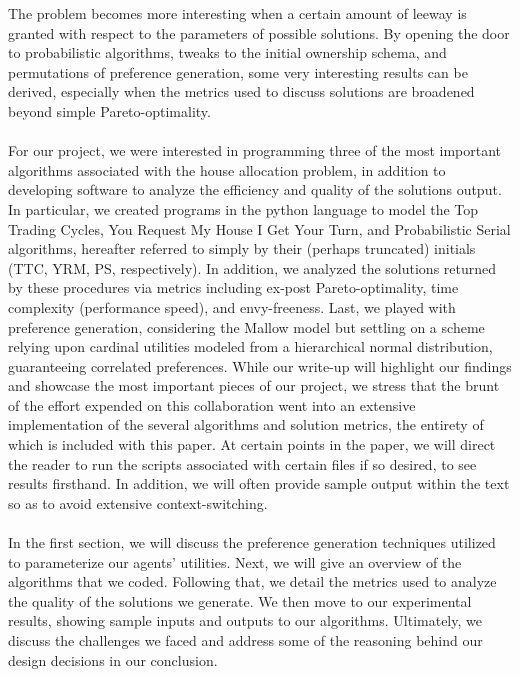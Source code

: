 \documentclass[12pt]{article}
\begin{document}
The problem becomes more interesting when a certain amount of leeway is granted with respect to the parameters of possible solutions. By opening the door to probabilistic algorithms, tweaks to the initial ownership schema, and permutations of preference generation, some very interesting results can be derived, especially when the metrics used to discuss solutions are broadened beyond simple Pareto-optimality.\\\\For our project, we were interested in programming three of the most important algorithms associated with the house allocation problem, in addition to developing software to analyze the efficiency and quality of the solutions output. In particular, we created programs in the python language to model the Top Trading Cycles, You Request My House I Get Your Turn, and Probabilistic Serial algorithms, hereafter referred to simply by their (perhaps truncated) initials (TTC, YRM, PS, respectively). In addition, we analyzed the solutions returned by these procedures via metrics including ex-post Pareto-optimality, time complexity (performance speed), and envy-freeness. Last, we played with preference generation, considering the Mallow model but settling on a scheme relying upon cardinal utilities modeled from a hierarchical normal distribution, guaranteeing correlated preferences. While our write-up will highlight our findings and showcase the most important pieces of our project, we stress that the brunt of the effort expended on this collaboration went into an extensive implementation of the several algorithms and solution metrics, the entirety of which is included with this paper. At certain points in the paper, we will direct the reader to run the scripts associated with certain files if so desired, to see results firsthand. In addition, we will often provide sample output within the text so as to avoid extensive context-switching.\\\\In the first section, we will discuss the preference generation techniques utilized to parameterize our agents' utilities. Next, we will give an overview of the algorithms that we coded. Following that, we detail the metrics used to analyze the quality of the solutions we generate. We then move to our experimental results, showing sample inputs and outputs to our algorithms. Ultimately, we discuss the challenges we faced and address some of the reasoning behind our design decisions in our conclusion.
\end{document}
